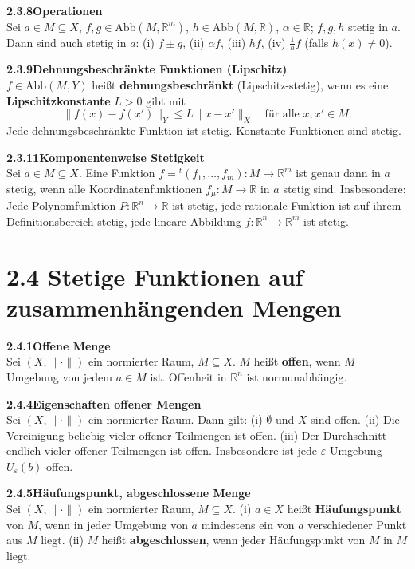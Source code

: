 \documentclass[a4paper,12pt]{article}
\newcommand{\gentry}[3]{%
  \noindent\textbf{#1\quad #2}\nopagebreak\\[0.2em]
  #3\par\smallskip
}
\begin{document}
\gentry{2.3.8}{Operationen}{%
  Sei $a \in M \subseteq X$, $f, g \in \mathrm{Abb}(M, \mathbb{R}^m)$,
  $h \in \mathrm{Abb}(M, \mathbb{R})$, $\alpha \in \mathbb{R}$; $f, g, h$ stetig in $a$.
  Dann sind auch stetig in $a$:
  (i) $f \pm g$, \quad (ii) $\alpha f$, \quad (iii) $hf$,
  \quad (iv) $\frac{1}{h} f$ (falls $h(x) \neq 0$).
}

\gentry{2.3.9}{Dehnungsbeschränkte Funktionen (Lipschitz)}{%
  $f \in \mathrm{Abb}(M, Y)$ heißt \textbf{dehnungsbeschränkt}
  (Lipschitz-stetig), wenn es eine \textbf{Lipschitzkonstante} $L > 0$ gibt mit
  \[
    \|f(x) - f(x')\|_Y \leq L \|x - x'\|_X \quad \text{für alle } x, x' \in M.
  \]
  Jede dehnungsbeschränkte Funktion ist stetig. Konstante Funktionen sind stetig.
}

\gentry{2.3.11}{Komponentenweise Stetigkeit}{%
  Sei $a \in M \subseteq X$. Eine Funktion $f = {}^t(f_1, \ldots, f_m): M \to \mathbb{R}^m$
  ist genau dann in $a$ stetig, wenn alle Koordinatenfunktionen
  $f_\mu: M \to \mathbb{R}$ in $a$ stetig sind.
  Insbesondere: Jede Polynomfunktion $P: \mathbb{R}^n \to \mathbb{R}$ ist stetig,
  jede rationale Funktion ist auf ihrem Definitionsbereich stetig, jede lineare
  Abbildung $f: \mathbb{R}^n \to \mathbb{R}^m$ ist stetig.
}

\section*{2.4 \quad Stetige Funktionen auf zusammenhängenden Mengen}

\gentry{2.4.1}{Offene Menge}{%
  Sei $(X, \|\cdot\|)$ ein normierter Raum, $M \subseteq X$. $M$ heißt
  \textbf{offen}, wenn $M$ Umgebung von jedem $a \in M$ ist.
  Offenheit in $\mathbb{R}^n$ ist normunabhängig.
}

\gentry{2.4.4}{Eigenschaften offener Mengen}{%
  Sei $(X, \|\cdot\|)$ ein normierter Raum. Dann gilt:
  (i) $\emptyset$ und $X$ sind offen.
  (ii) Die Vereinigung beliebig vieler offener Teilmengen ist offen.
  (iii) Der Durchschnitt endlich vieler offener Teilmengen ist offen.
  Insbesondere ist jede $\varepsilon$-Umgebung $U_\varepsilon(b)$ offen.
}

\gentry{2.4.5}{Häufungspunkt, abgeschlossene Menge}{%
  Sei $(X, \|\cdot\|)$ ein normierter Raum, $M \subseteq X$.
  (i) $a \in X$ heißt \textbf{Häufungspunkt} von $M$, wenn in jeder Umgebung
  von $a$ mindestens ein von $a$ verschiedener Punkt aus $M$ liegt.
  (ii) $M$ heißt \textbf{abgeschlossen}, wenn jeder Häufungspunkt von $M$ in $M$ liegt.
}
\end{document}
